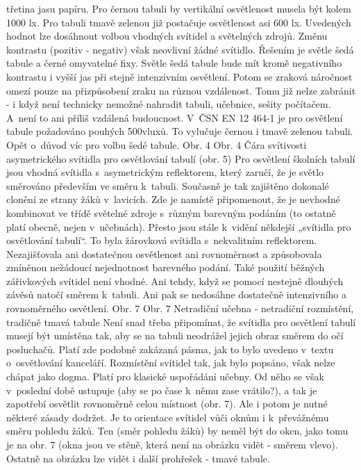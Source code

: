 třetina jasu papíru. Pro černou tabuli by vertikální osvětlenost musela být kolem 1000 lx.
Pro tabuli tmavě zelenou již postačuje osvětlenost asi 600 lx. Uvedených hodnot lze dosáhnout
volbou vhodných svítidel a světelných zdrojů. Změnu kontrastu (pozitiv - negativ) však
neovlivní žádné svítidlo. Řešením je světle šedá tabule a černé omyvatelné fixy.
Světle šedá tabule bude mít kromě negativního kontrastu i vyšší jas při stejně intenzivním osvětlení.
 Potom se zraková náročnost omezí pouze na přizpůsobení zraku na různou vzdálenost.
 Tomu již nelze zabránit - i když není technicky nemožné nahradit tabuli, učebnice, sešity počítačem.
 A~není to ani příliš vzdálená budoucnost.
\medskip
V~ČSN EN 12 464-1 je pro osvětlení tabule požadováno pouhých 500vluxů. To vylučuje černou i tmavě zelenou tabuli.
 Opět o~důvod víc pro volbu šedé tabule.
Obr. 4
Obr. 4 Čára svítivosti asymetrického svítidla pro osvětlování tabulí (obr. 5)
\medskip
Pro osvětlení školních tabulí jsou vhodná svítidla s~asymetrickým reflektorem, který zaručí,
že je světlo směrováno především ve směru k~tabuli. Současně je tak zajištěno dokonalé clonění
ze strany žáků v~lavicích.
\medskip
Zde je namístě připomenout, že je nevhodné kombinovat ve třídě světelné zdroje s~různým barevným podáním
(to ostatně platí obecně, nejen v~učebnách). Přesto jsou stále k~vidění někdejší „svítidla pro osvětlování tabulí“.
 To byla žárovková svítidla s~nekvalitním reflektorem. Nezajišťovala ani dostatečnou osvětlenost
 ani rovnoměrnost a způsobovala zmíněnou nežádoucí nejednotnost barevného podání.
\medskip
Také použití běžných zářivkových svítidel není vhodné. Ani tehdy, když se pomocí nestejně
dlouhých závěsů natočí směrem k~tabuli. Ani pak se nedosáhne dostatečně intenzivního a rovnoměrného osvětlení.
Obr. 7
Obr. 7 Netradiční učebna - netradiční rozmístění, tradičně tmavá tabule
\medskip
Není snad třeba připomínat, že svítidla pro osvětlení tabulí musejí být umístěna tak, aby se
na tabuli neodrážel jejich obraz směrem do očí posluchačů. Platí zde podobně zakázaná pásma,
jak to bylo uvedeno v~textu o~osvětlování kanceláří.
\medskip
Rozmístění svítidel tak, jak bylo popsáno, však nelze chápat jako dogma. Platí pro klasické
uspořádání učebny. Od něho se však v~poslední době ustupuje (aby se po čase k~němu zase vrátilo?),
a tak je zapotřebí osvětlit rovnoměrně celou místnost (obr. 7).
\medskip
Ale i potom je nutné některé zásady dodržet. Je to orientace svítidel vůči oknům i k~převážnému směru
pohledu žáků. Ten (směr pohledu žáků) by neměl být do oken, jako tomu je na obr. 7 (okna jsou ve stěně,
která není na obrázku vidět - směrem vlevo). Ostatně na obrázku lze vidět i další prohřešek - tmavé tabule.